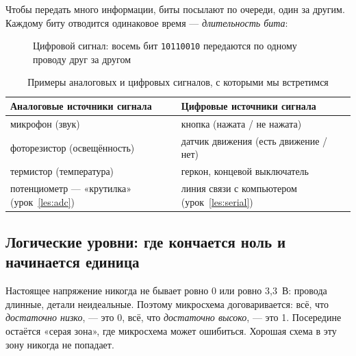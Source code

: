 Чтобы передать много информации, биты посылают по очереди, один за другим. Каждому биту отводится
одинаковое время --- \emph{длительность бита}:

\begin{figure}[H]
\centering
{}
\caption{Цифровой сигнал: восемь бит \texttt{10110010} передаются по одному проводу друг за другом}
\end{figure}

\begin{table}[H]
\centering\small
\begin{tabularx}{\textwidth}{@{}X X@{}}
\toprule
\textbf{Аналоговые источники сигнала} & \textbf{Цифровые источники сигнала}\\
\midrule
микрофон (звук) & кнопка (нажата / не нажата)\\
фоторезистор (освещённость) & датчик движения (есть движение / нет)\\
термистор (температура) & геркон, концевой выключатель\\
потенциометр --- «крутилка» (урок~\ref{les:adc}) & линия связи с компьютером (урок~\ref{les:serial})\\
\bottomrule
\end{tabularx}
\caption{Примеры аналоговых и цифровых сигналов, с которыми мы встретимся}
\end{table}

\subsection{Логические уровни: где кончается ноль и начинается единица}

Настоящее напряжение никогда не бывает ровно 0 или ровно 3,3~В: провода длинные, детали неидеальные.
Поэтому микросхема договаривается: всё, что \emph{достаточно низко}, --- это 0, всё, что
\emph{достаточно высоко}, --- это 1. Посередине остаётся «серая зона», где микросхема может
ошибиться. Хорошая схема в эту зону никогда не попадает.

